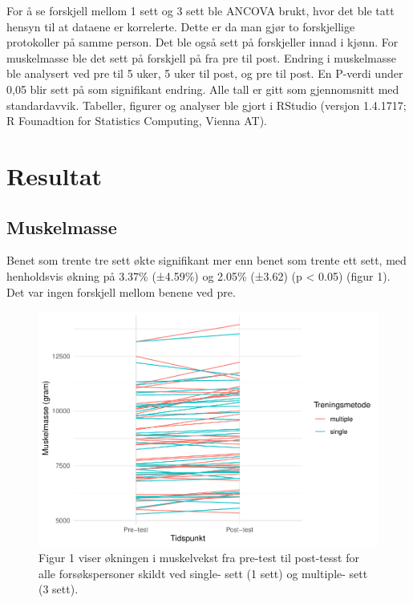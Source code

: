 \documentclass[
]{book}
\begin{document}
For å se forskjell mellom 1 sett og 3 sett ble ANCOVA brukt, hvor det ble tatt hensyn til at dataene er korrelerte. Dette er da man gjør to forskjellige protokoller på samme person. Det ble også sett på forskjeller innad i kjønn. For muskelmasse ble det sett på forskjell på fra pre til post. Endring i muskelmasse ble analysert ved pre til 5 uker, 5 uker til post, og pre til post. En P-verdi under 0,05 blir sett på som signifikant endring. Alle tall er gitt som gjennomsnitt med standardavvik. Tabeller, figurer og analyser ble gjort i RStudio (versjon 1.4.1717; R Founadtion for Statistics Computing, Vienna AT).

\hypertarget{resultat-1}{%
\section{Resultat}\label{resultat-1}}

\hypertarget{muskelmasse}{%
\subsection{Muskelmasse}\label{muskelmasse}}

Benet som trente tre sett økte signifikant mer enn benet som trente ett sett, med henholdsvis økning på 3.37\% (±4.59\%) og 2.05\% (±3.62) (p \textless{} 0.05) (figur 1). Det var ingen forskjell mellom benene ved pre.

\begin{figure}
\centering
\includegraphics{_main_files/figure-latex/figur-1.pdf}
\caption{\label{fig:figur}Figur 1 viser økningen i muskelvekst fra pre-test til post-tesst for alle forsøkspersoner skildt ved single- sett (1 sett) og multiple- sett (3 sett).}
\end{figure}
\end{document}
